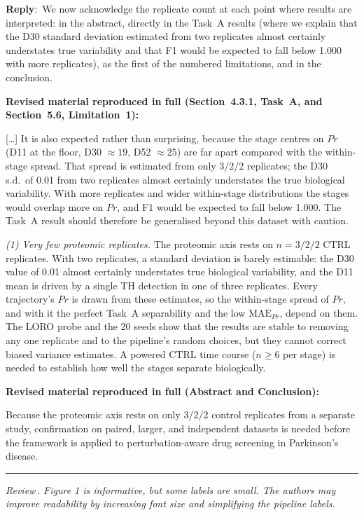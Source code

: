 \documentclass[11pt]{article}
\newcounter{reviewer}
\newcounter{point}[reviewer]
\renewcommand{\thepoint}{Review\,\thereviewer.\arabic{point}}
\newcommand{\point}[1]{\refstepcounter{point}  \bigskip \hrule \medskip \noindent \textit{{\fontseries{b}\selectfont \thepoint } #1}\par}
\newcommand{\reply}{\medskip \noindent \textbf{Reply}:\ }
\newcommand{\revisedheading}[1]{\medskip\noindent\textbf{Revised material
  reproduced in full (#1):}\par}
\newenvironment{revised}{\par\color{red}}{\par}
\begin{document}
\reply{We now acknowledge the replicate count at each point where results are interpreted: in the abstract, directly in the Task~A results (where we explain that the D30 standard deviation estimated from two replicates almost certainly understates true variability and that F1 would be expected to fall below 1.000 with more replicates), as the first of the numbered limitations, and in the conclusion.}

\revisedheading{Section~4.3.1, Task~A, and Section~5.6, Limitation~1}
\begin{revised}
[\ldots] It is also expected rather than surprising, because the stage centres on $Pr$ (D11 at the floor, D30 $\approx 19$, D52 $\approx 25$) are far apart compared with the within-stage spread. That spread is estimated from only 3/2/2 replicates; the D30 s.d.\ of 0.01 from two replicates almost certainly understates the true biological variability. With more replicates and wider within-stage distributions the stages would overlap more on $Pr$, and F1 would be expected to fall below 1.000. The Task~A result should therefore be generalised beyond this dataset with caution.

\textit{(1) Very few proteomic replicates.} The proteomic axis rests on $n = 3/2/2$ CTRL replicates. With two replicates, a standard deviation is barely estimable: the D30 value of 0.01 almost certainly understates true biological variability, and the D11 mean is driven by a single TH detection in one of three replicates. Every trajectory's $Pr$ is drawn from these estimates, so the within-stage spread of $Pr$, and with it the perfect Task~A separability and the low $\text{MAE}_{Pr}$, depend on them. The LORO probe and the 20 seeds show that the results are stable to removing any one replicate and to the pipeline's random choices, but they cannot correct biased variance estimates. A powered CTRL time course ($n \geq 6$ per stage) is needed to establish how well the stages separate biologically.
\end{revised}

\revisedheading{Abstract and Conclusion}
\begin{revised}
Because the proteomic axis rests on only 3/2/2 control replicates from a separate study, confirmation on paired, larger, and independent datasets is needed before the framework is applied to perturbation-aware drug screening in Parkinson's disease.
\end{revised}

\point{ Figure 1 is informative, but some labels are small. The authors may improve readability by increasing font size and simplifying the pipeline labels.}
\end{document}
